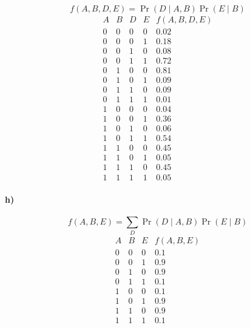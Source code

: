 \documentclass[12pt]{article}
\begin{document}
\[f(A,B,D,E)=\Pr(D\mid A,B)\Pr(E\mid B)\]
\[
        \begin{array}{c|c|c|c|c}
                A & B & D & E & f(A,B,D,E)\\
                \hline
                0 & 0 & 0 & 0 & 0.02\\
                0 & 0 & 0 & 1 & 0.18\\
                0 & 0 & 1 & 0 & 0.08\\
                0 & 0 & 1 & 1 & 0.72\\
                0 & 1 & 0 & 0 & 0.81\\
                0 & 1 & 0 & 1 & 0.09\\
                0 & 1 & 1 & 0 & 0.09\\
                0 & 1 & 1 & 1 & 0.01\\
                1 & 0 & 0 & 0 & 0.04\\
                1 & 0 & 0 & 1 & 0.36\\
                1 & 0 & 1 & 0 & 0.06\\
                1 & 0 & 1 & 1 & 0.54\\
                1 & 1 & 0 & 0 & 0.45\\
                1 & 1 & 0 & 1 & 0.05\\
                1 & 1 & 1 & 0 & 0.45\\
                1 & 1 & 1 & 1 & 0.05
        \end{array}
\]

\paragraph{h)}

\[f(A,B,E)=\sum_D\Pr(D\mid A,B)\Pr(E\mid B)\]
\[
        \begin{array}{c|c|c|c}
                A & B & E & f(A,B,E)\\
                \hline
                0 & 0 & 0 & 0.1\\
                0 & 0 & 1 & 0.9\\
                0 & 1 & 0 & 0.9\\
                0 & 1 & 1 & 0.1\\
                1 & 0 & 0 & 0.1\\
                1 & 0 & 1 & 0.9\\
                1 & 1 & 0 & 0.9\\
                1 & 1 & 1 & 0.1
        \end{array}
\]
\end{document}
